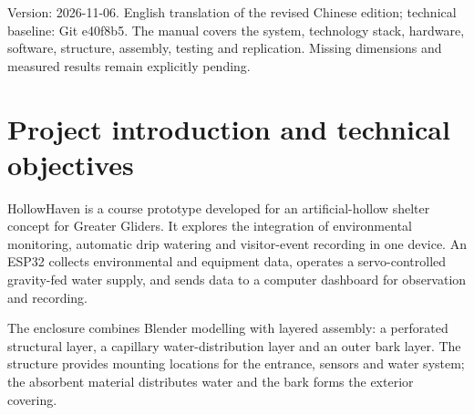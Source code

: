 \documentclass[10pt,a4paper]{article}
\begin{document}
\thispagestyle{empty}
\begingroup
{}
\vspace*{12mm}
\noindent{}\par
\vspace*{64mm}
\noindent{}\par
\vspace{8mm}
\noindent{}\par
\vfill
\noindent{}\par
\vspace*{18mm}
\endgroup
\clearpage
\renewcommand{\contentsname}{Contents}
\begingroup{}\small\setcounter{tocdepth}{1}\tableofcontents\endgroup\clearpage
{}\raggedright
Version: 2026-11-06. English translation of the revised Chinese edition; technical baseline: Git e40f8b5. The manual covers the system, technology stack, hardware, software, structure, assembly, testing and replication. Missing dimensions and measured results remain explicitly pending.
\section{Project introduction and technical objectives}

HollowHaven is a course prototype developed for an artificial-hollow shelter concept for Greater Gliders. It explores the integration of environmental monitoring, automatic drip watering and visitor-event recording in one device. An ESP32 collects environmental and equipment data, operates a servo-controlled gravity-fed water supply, and sends data to a computer dashboard for observation and recording.


The enclosure combines Blender modelling with layered assembly: a perforated structural layer, a capillary water-distribution layer and an outer bark layer. The structure provides mounting locations for the entrance, sensors and water system; the absorbent material distributes water and the bark forms the exterior covering.
\end{document}
